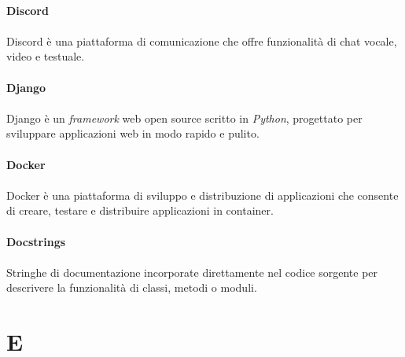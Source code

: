 \documentclass[10pt, a4paper]{article}
\begin{document}
\vspace{2em}
\paragraph{Discord}\noindent\hrulefill
\paragraph{}Discord è una piattaforma di comunicazione che offre funzionalità di chat vocale, video e testuale.

\vspace{2em}
\paragraph{Django}\noindent\hrulefill
\paragraph{}Django è un \textit{framework\pg} web open source scritto in \textit{Python\pg}, progettato per sviluppare applicazioni web in modo rapido e pulito.

\vspace{2em}
\paragraph{Docker}\noindent\hrulefill
\paragraph{}Docker è una piattaforma di sviluppo e distribuzione di applicazioni che consente di creare, testare e distribuire applicazioni in container.

\vspace{2em}
\paragraph{Docstrings}\noindent\hrulefill
\paragraph{}Stringhe di documentazione incorporate direttamente nel codice sorgente per descrivere la funzionalità di classi, metodi o moduli.



\newpage
\section{E}
\end{document}
